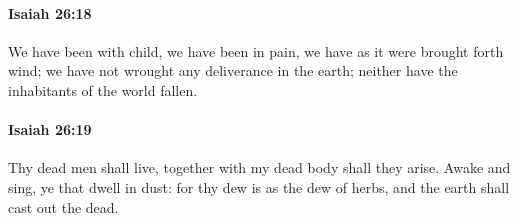 		\paragraph{Isaiah 26:18} %
			\label{ISAIAH-26-18}

			We have been with child, we have been in pain, we have as it were brought forth wind; we have not wrought any deliverance in the earth; neither have the inhabitants of the world fallen.


		\paragraph{Isaiah 26:19} %
			\label{ISAIAH-26-19}

			Thy dead men shall live, together with my dead body shall they arise. Awake and sing, ye that dwell in dust: for thy dew is as the dew of herbs, and the earth shall cast out the dead.


